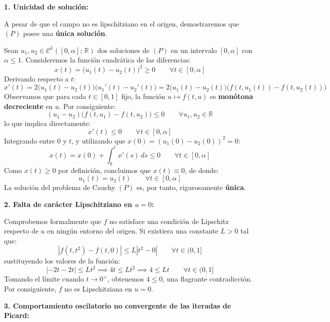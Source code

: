 {    \textbf{1. Unicidad de solución:}

    A pesar de que el campo no es lipschitziano en el origen, demostraremos que $(P)$ posee una \textbf{única solución}.
    
    Sean $u_1, u_2 \in \mathcal{C}^1([0, \alpha]; \, \mathbb{R})$ dos soluciones de $(P)$ en un intervalo $[0, \alpha]$ con $\alpha \leq 1$. Consideremos la función cuadrática de las diferencias:
    \[
        x(t) = \bigl(u_1(t) - u_2(t)\bigr)^2 \geq 0 \qquad \forall t \in [0, \alpha]
    \]
    Derivando respecto a $t$:
    \[
        x'(t) = 2\bigl(u_1(t) - u_2(t)\bigr)\bigl(u_1'(t) - u_2'(t)\bigr) = 2\bigl(u_1(t) - u_2(t)\bigr)\bigl(f(t, u_1(t)) - f(t, u_2(t))\bigr)
    \]
    Observamos que para cada $t \in [0, 1]$ fijo, la función $u \mapsto f(t, u)$ es \textbf{monótona decreciente} en $u$. Por consiguiente:
    \[
        (u_1 - u_2)\bigl(f(t, u_1) - f(t, u_2)\bigr) \leq 0 \qquad \forall u_1, u_2 \in \mathbb{R}
    \]
    lo que implica directamente:
    \[
        x'(t) \leq 0 \qquad \forall t \in [0, \alpha]
    \]
    Integrando entre $0$ y $t$, y utilizando que $x(0) = (u_1(0) - u_2(0))^2 = 0$:
    \[
        x(t) = x(0) + \int_0^t x'(s) \, ds \leq 0 \qquad \forall t \in [0, \alpha]
    \]
    Como $x(t) \geq 0$ por definición, concluimos que $x(t) \equiv 0$, de donde:
    \[
        u_1(t) = u_2(t) \qquad \forall t \in [0, \alpha]
    \]
    La solución del problema de Cauchy $(P)$ es, por tanto, rigurosamente \textbf{única}.

    \medskip

    \textbf{2. Falta de carácter Lipschitziano en $u = 0$:}

    Comprobemos formalmente que $f$ no satisface una condición de Lipschitz respecto de $u$ en ningún entorno del origen. Si existiera una constante $L > 0$ tal que:
    \[
        |f(t, t^2) - f(t, 0)| \leq L |t^2 - 0| \qquad \forall t \in (0, 1]
    \]
    sustituyendo los valores de la función:
    \[
        |-2t - 2t| \leq L t^2 \implies 4t \leq L t^2 \implies 4 \leq L t \qquad \forall t \in (0, 1]
    \]
    Tomando el límite cuando $t \to 0^+$, obtenemos $4 \leq 0$, una flagrante contradicción. Por consiguiente, $f$ no es Lipschitziana en $u = 0$.

    \medskip

    \textbf{3. Comportamiento oscilatorio no convergente de las iteradas de Picard:}

}
